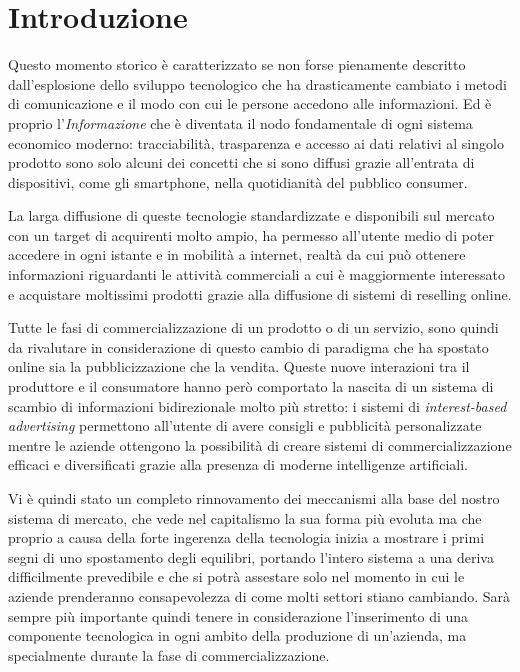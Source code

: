 
\chapter*{Introduzione}

Questo momento storico è caratterizzato se non forse pienamente descritto
dall'esplosione dello sviluppo tecnologico che ha drasticamente cambiato
i metodi di comunicazione e il modo con cui le persone accedono alle
informazioni. Ed è proprio l'\emph{Informazione} che è diventata il
nodo fondamentale di ogni sistema economico moderno: tracciabilità,
trasparenza e accesso ai dati relativi al singolo prodotto sono solo
alcuni dei concetti che si sono diffusi grazie all'entrata di dispositivi,
come gli smartphone, nella quotidianità del pubblico consumer.\medskip{}

La larga diffusione di queste tecnologie standardizzate e disponibili
sul mercato con un target di acquirenti molto ampio, ha permesso all'utente
medio di poter accedere in ogni istante e in mobilità a internet,
realtà da cui può ottenere informazioni riguardanti le attività commerciali
a cui è maggiormente interessato e acquistare moltissimi prodotti
grazie alla diffusione di sistemi di reselling online.

\medskip{}

Tutte le fasi di commercializzazione di un prodotto o di un servizio,
sono quindi da rivalutare in considerazione di questo cambio di paradigma
che ha spostato online sia la pubblicizzazione che la vendita. Queste
nuove interazioni tra il produttore e il consumatore hanno però comportato
la nascita di un sistema di scambio di informazioni bidirezionale
molto più stretto: i sistemi di \emph{interest-based advertising}
permettono all'utente di avere consigli e pubblicità personalizzate
mentre le aziende ottengono la possibilità di creare sistemi di commercializzazione
efficaci e diversificati grazie alla presenza di moderne intelligenze
artificiali.\medskip{}

Vi è quindi stato un completo rinnovamento dei meccanismi alla base
del nostro sistema di mercato, che vede nel capitalismo la sua forma
più evoluta ma che proprio a causa della forte ingerenza della tecnologia
inizia a mostrare i primi segni di uno spostamento degli equilibri,
portando l'intero sistema a una deriva difficilmente prevedibile e
che si potrà assestare solo nel momento in cui le aziende prenderanno
consapevolezza di come molti settori stiano cambiando. Sarà sempre
più importante quindi tenere in considerazione l'inserimento di una
componente tecnologica in ogni ambito della produzione di un'azienda,
ma specialmente durante la fase di commercializzazione.\medskip{}

